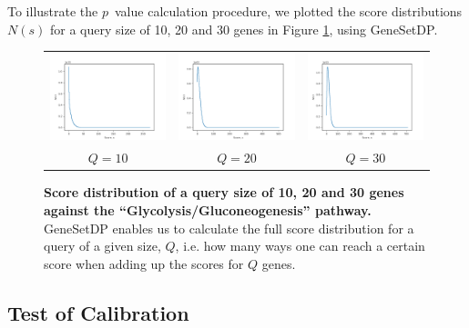 \documentclass[a4paper,american]{lipics-v2016}
\begin{document}
To illustrate the $p$~value calculation procedure, we plotted the score distributions $N(s)$ for a query size of 10, 20 and 30 genes in Figure \ref{fig:score_dist}, using GeneSetDP.

\begin{figure}[htb]
	\begin{center}
    \begin{tabular}{c@{}c@{}c}
      \includegraphics[width=5cm]{figures/score_distribuition_Q10.png} &
      \includegraphics[width=5cm]{figures/score_distribuition_Q20.png} &
      \includegraphics[width=5cm]{figures/score_distribuition_Q30.png} \\
      $Q=10$ & $Q=20$ & $Q=30$ \\
    \end{tabular}
	\end{center}
  \caption{{\bf Score distribution of a query size of 10, 20 and 30 genes against the ``Glycolysis/Gluconeogenesis'' pathway.} GeneSetDP enables us to calculate the full score distribution for a query of a given size, $Q$, i.e. how many ways one can reach a certain score when adding up the scores for $Q$ genes.}
  \label{fig:score_dist}
\end{figure}

\subsection*{Test of Calibration}
\end{document}
